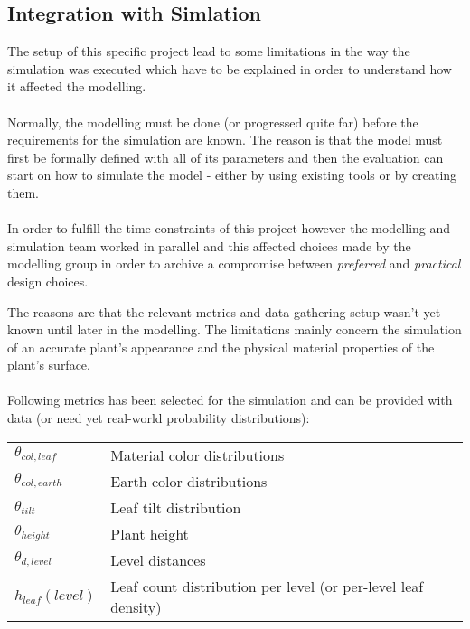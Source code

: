 \graphicspath{{members/ssr/figures/}}

\subsection{Integration with Simlation}

The setup of this specific project lead to some limitations in the way the simulation was executed which have to be explained
in order to understand how it affected the modelling.
\\
\\
Normally, the modelling must be done (or progressed quite far) before the requirements for the simulation are known.
The reason is that the model must first be formally defined with all of its parameters and then the evaluation can start
on how to simulate the model - either by using existing tools or by creating them.
\\
\\
In order to fulfill the time constraints of this project however the modelling and simulation team worked in parallel and
this affected choices made by the modelling group in order to archive a compromise between \textit{preferred} and \textit{practical} design choices.

The reasons are that the relevant metrics and data gathering setup wasn't yet known until later in the modelling.
The limitations mainly concern the simulation of an accurate plant's appearance and the physical material properties
of the plant's surface.
\\
\\
Following metrics has been selected for the simulation and can be provided with data (or need yet real-world probability distributions):
\\

\begin{center}
    \begin{tabular}{ |l|l| }
        \hline
        $\theta_{col,leaf}$ & Material color distributions \\
        $\theta_{col,earth}$ & Earth color distributions  \\
        $\theta_{tilt}$ & Leaf tilt distribution  \\
        $\theta_{height}$ & Plant height  \\
        $\theta_{d,level}$ & Level distances  \\
        $h_{leaf}(level)$ & Leaf count distribution per level (or per-level leaf density) \\
        \hline
    \end{tabular}
\end{center}